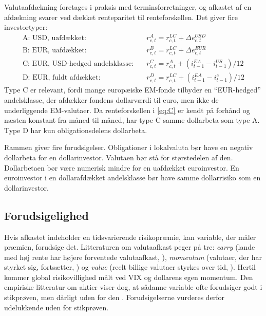 \documentclass[11pt,a4paper]{article}
\begin{document}
Valutaafdækning foretages i praksis med terminsforretninger, og afkastet af en afdækning svarer ved dækket renteparitet til renteforskellen. Det giver fire investortyper:
\begin{align}
\text{A: USD, uafdækket:}\quad & r^{A}_{c,t} = r^{LC}_{c,t} + \Delta e^{USD}_{c,t} \label{eq:A}\\
\text{B: EUR, uafdækket:}\quad & r^{B}_{c,t} = r^{LC}_{c,t} + \Delta e^{EUR}_{c,t} \label{eq:B}\\
\text{C: EUR, USD-hedged andelsklasse:}\quad & r^{C}_{c,t} = r^{A}_{c,t} + (i^{EA}_{t-1} - i^{US}_{t-1})/12 \label{eq:C}\\
\text{D: EUR, fuldt afdækket:}\quad & r^{D}_{c,t} = r^{LC}_{c,t} + (i^{EA}_{t-1} - i^{c}_{t-1})/12 \label{eq:D}
\end{align}
Type C er relevant, fordi mange europæiske EM-fonde tilbyder en ``EUR-hedged'' andelsklasse, der afdækker fondens dollarværdi til euro, men ikke de underliggende EM-valutaer. Da renteforskellen i \eqref{eq:C} er kendt på forhånd og næsten konstant fra måned til måned, har type C samme dollarbeta som type A. Type D har kun obligationsdelens dollarbeta.

Rammen giver fire forudsigelser. Obligationer i lokalvaluta bør have en negativ dollarbeta for en dollarinvestor. Valutaen bør stå for størstedelen af den. Dollarbetaen bør være numerisk mindre for en uafdækket euroinvestor. En euroinvestor i en dollarafdækket andelsklasse bør have samme dollarrisiko som en dollarinvestor.

\subsection{Forudsigelighed}
Hvis afkastet indeholder en tidsvarierende risikopræmie, kan variable, der måler præmien, forudsige det. Litteraturen om valutaafkast peger på tre: \emph{carry} (lande med høj rente har højere forventede valutaafkast, \citealp{lustig2007,lustig2011}), \emph{momentum} (valutaer, der har styrket sig, fortsætter, \citealp{menkhoff2012}) og \emph{value} (reelt billige valutaer styrkes over tid, \citealp{asness2013}). Hertil kommer global risikovillighed målt ved VIX og dollarens egen momentum. Den empiriske litteratur om aktier viser dog, at sådanne variable ofte forudsiger godt i stikprøven, men dårligt uden for den \citep{welch2008}. Forudsigelserne vurderes derfor udelukkende uden for stikprøven.

\end{document}
